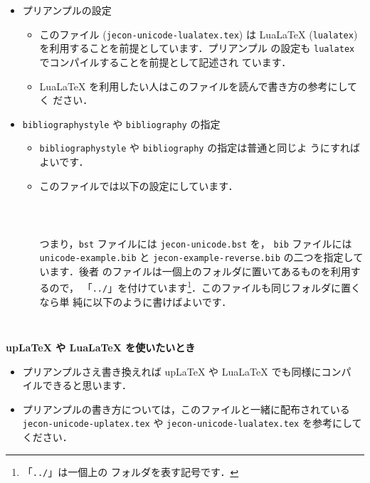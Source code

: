 \documentclass{ltjsarticle}
\begin{document}
\begin{itemize}
 \item プリアンプルの設定
       \begin{itemize}
        \item このファイル (\texttt{jecon-unicode-lualatex.tex}) は LuaLaTeX
              (\texttt{lualatex}) を利用することを前提としています．プリアンプル
              の設定も \texttt{lualatex} でコンパイルすることを前提として記述され
              ています．
        \item LuaLaTeX を利用したい人はこのファイルを読んで書き方の参考にしてく
              ださい．
       \end{itemize}
 \item \texttt{bibliographystyle} や \texttt{bibliography} の指定
       \begin{itemize}
        \item \texttt{bibliographystyle} や \texttt{bibliography} の指定は普通と同じよ
       うにすればよいです．
        \item このファイルでは以下の設定にしています．
\begin{verbatim}
               
                
\end{verbatim}
       つまり，\texttt{bst} ファイルには \texttt{jecon-unicode.bst} を，
              \texttt{bib} ファイルには \texttt{unicode-example.bib} と
              \texttt{jecon-example-reverse.bib} の二つを指定しています．後者
              のファイルは一個上のフォルダに置いてあるものを利用するので，
              「\texttt{../}」を付けています\footnote{「\texttt{../}」は一個上の
              フォルダを表す記号です．}．このファイルも同じフォルダに置くなら単
              純に以下のように書けばよいです．
\begin{verbatim}
                
\end{verbatim}
       \end{itemize}
\end{itemize}

\vspace*{1em}

\textbf{upLaTeX や LuaLaTeX を使いたいとき}
\begin{itemize}
        \item プリアンプルさえ書き換えれば upLaTeX や LuaLaTeX でも同様にコンパ
              イルできると思います．
        \item プリアンプルの書き方については，このファイルと一緒に配布されている
              \texttt{jecon-unicode-uplatex.tex} や
              \texttt{jecon-unicode-lualatex.tex} を参考にしてください．
\end{itemize}
\end{document}
